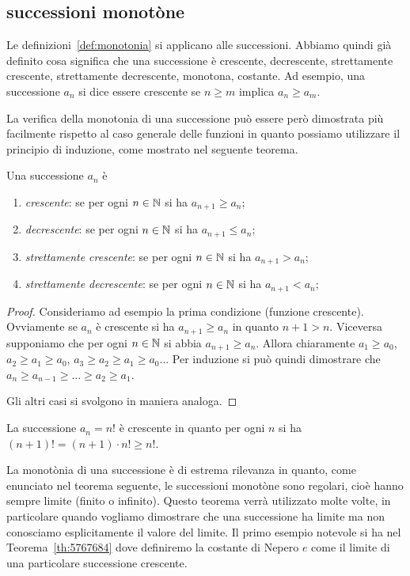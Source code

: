 \subsection{successioni monotòne}

Le definizioni~\ref{def:monotonia} si applicano alle successioni. 
Abbiamo quindi già definito cosa significa che una successione è 
crescente, decrescente, strettamente crescente, strettamente decrescente,
monotona, costante. Ad esempio, una successione $a_n$ si dice essere 
crescente se $n\ge m$ implica $a_n \ge a_m$.

La verifica della monotonia di una successione può essere però dimostrata 
più facilmente rispetto al caso generale delle funzioni in quanto 
possiamo utilizzare il principio di induzione, come mostrato 
nel seguente teorema.


\begin{theorem}
  \mymark{***}%
Una successione $a_n$ è
\begin{enumerate}
\item \emph{crescente}: se per ogni $n\in {\mathbb N}$ si ha $a_{n+1} \ge a_n$;
\item \emph{decrescente}: se per ogni $n\in {\mathbb N}$ si ha $a_{n+1} \le a_n$;
\item \emph{strettamente crescente}: se per ogni $n\in {\mathbb N}$ si ha $a_{n+1}>a_n$;
\item \emph{strettamente decrescente}: se per ogni $n\in {\mathbb N}$ si ha
$a_{n+1}<a_n$;
\end{enumerate}
\end{theorem}
%
\begin{proof}
  Consideriamo ad esempio la prima condizione (funzione crescente).
Ovviamente se $a_n$ è crescente si ha $a_{n+1}\ge a_n$ in quanto $n+1 > n$.
Viceversa supponiamo che per ogni $n\in {\mathbb N}$ si abbia $a_{n+1}\ge a_n$.  Allora
chiaramente $a_1\ge a_0$, $a_2\ge a_1 \ge a_0$, $a_3 \ge a_2 \ge a_1 \ge a_0$...
Per induzione si può quindi dimostrare che  $a_n \ge a_{n-1} \ge \dots \ge a_2
\ge a_1$.

Gli altri casi si svolgono in maniera analoga.
\end{proof}

\begin{example}
  La successione $a_n = n!$ è crescente 
  in quanto per ogni $n$ si ha $(n+1)! = (n+1)\cdot n! \ge n!$.
\end{example}

La monotònia di una successione è di estrema rilevanza in quanto,
come enunciato nel teorema seguente, le successioni monotòne sono regolari, 
cioè hanno sempre limite (finito o infinito). 
Questo teorema verrà utilizzato molte volte, in particolare quando vogliamo 
dimostrare che una successione ha limite ma non conosciamo esplicitamente il valore 
del limite. 
Il primo esempio notevole si ha nel Teorema~\ref{th:5767684} dove definiremo 
la costante di Nepero $e$ come il limite di una particolare successione crescente.

